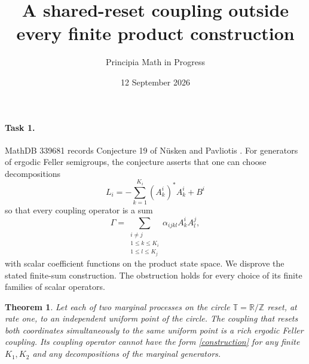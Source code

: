 \documentclass[10pt]{article}
\title{A shared-reset coupling outside every finite product construction}
\author{Principia Math in Progress}
\date{12 September 2026}
\newtheorem{theorem}{Theorem}
\newcommand{\T}{\mathbb T}
\begin{document}
\maketitle

\paragraph{Task 1.}
MathDB 339681 records Conjecture 19 of N\"usken and Pavliotis
\cite[pp.~337--338]{NP}. For generators of ergodic Feller semigroups,
the conjecture asserts that one can choose decompositions
\[
 L_i=-\sum_{k=1}^{K_i}(A_k^i)^*A_k^i+B^i
\]
so that every coupling operator is a sum
\begin{equation}\label{construction}
 \Gamma=\sum_{\substack{i\ne j\\1\leq k\leq K_i\\1\leq l\leq K_j}}
 \alpha_{ijkl} A_k^i A_l^j ,
\end{equation}
with scalar coefficient functions on the product state space.
We disprove the stated finite-sum construction. The obstruction holds
for every choice of its finite families of scalar operators.

\begin{theorem}
Let each of two marginal processes on the circle \(\T=\mathbb R/\mathbb Z\)
reset, at rate one, to an independent uniform point of the circle.
The coupling that resets both coordinates simultaneously to the same
uniform point is a rich ergodic Feller coupling. Its coupling operator
cannot have the form \eqref{construction} for any finite \(K_1,K_2\)
and any decompositions of the marginal generators.
\end{theorem}
\end{document}
